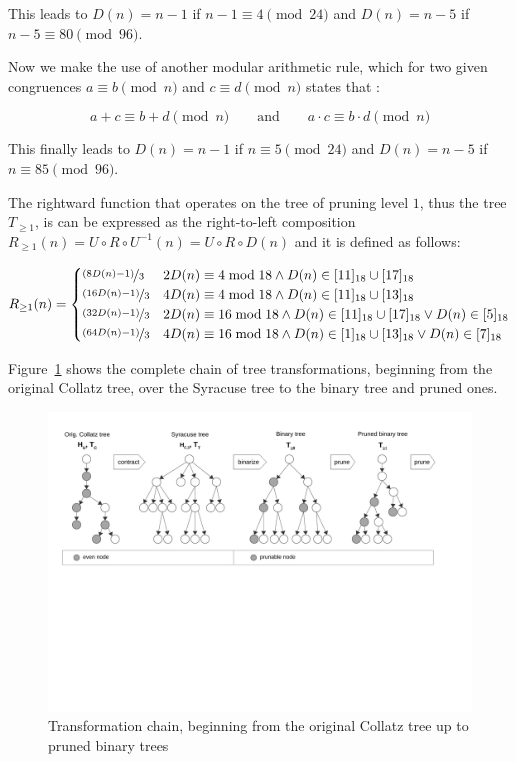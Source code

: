 This leads to $D(n)=n-1$ if $n-1\equiv4\pmod{24}$ and $D(n)=n-5$ if $n-5\equiv80\pmod{96}$.

Now we make the use of another modular arithmetic rule, which for two given congruences $a\equiv b\pmod n$ and $c\equiv d\pmod n$ states that \cite[p.~19]{Ref_Mueller-Stach_2011}:

\begin{equation}
	a+c\equiv b+d\pmod n\hspace{2em} \text{and}\hspace{2em}a\cdot c\equiv b\cdot d\pmod n
\end{equation}

This finally leads to $D(n)=n-1$ if $n\equiv5\pmod{24}$ and $D(n)=n-5$ if $n\equiv85\pmod{96}$.

The rightward function that operates on the tree of pruning level $1$, thus the tree $T_{\ge1}$, is can be expressed as the right-to-left composition $R_{\ge1}(n)=U\circ R\circ U^{-1}(n)=U\circ R\circ D(n)$ and it is defined as follows:

\[
R_{\ge1}(n)=\begin{cases}
	\nicefrac{(8D(n)-1)}{3}	&	2D(n)\equiv4\bmod{18}\wedge D(n)\in[11]_{18}\cup[17]_{18}\\
	\nicefrac{(16D(n)-1)}{3}	&	4D(n)\equiv4\bmod{18}\wedge D(n)\in[11]_{18}\cup[13]_{18}\\
	\nicefrac{(32D(n)-1)}{3}	&	2D(n)\equiv16\bmod{18}\wedge D(n)\in[11]_{18}\cup[17]_{18}\vee D(n)\in[5]_{18}\\
	\nicefrac{(64D(n)-1)}{3}	&	4D(n)\equiv16\bmod{18}\wedge D(n)\in[1]_{18}\cup[13]_{18}\vee D(n)\in[7]_{18}\end{cases}
\]

\newpage
Figure~\ref{fig:tree_transformations} shows the complete chain of tree transformations, beginning from the original Collatz tree, over the Syracuse tree to the binary tree and pruned ones.

\begin{figure}[H]
	\includegraphics[trim=1.1cm 10cm 2.6cm 0.2cm, 
	width=1.00\textwidth,page=1]{figures/tree_transformations.pdf}
	\caption{Transformation chain, beginning from the original Collatz tree up to pruned binary trees}
	\label{fig:tree_transformations}
\end{figure}